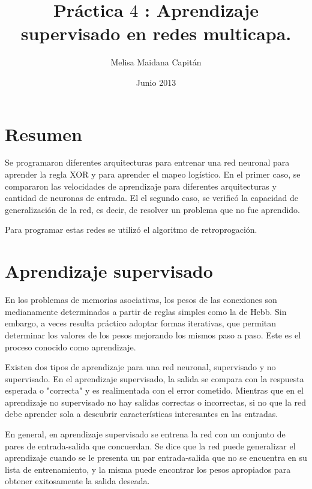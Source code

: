 \documentclass[aps,prb,onecolumn,10pt,floatfix,superscriptaddress]{article} %
\begin{document}
\title{Pr\'actica $4$ : Aprendizaje supervisado en redes multicapa.}

\author{Melisa Maidana Capit\'an}

\date{Junio 2013} %

\maketitle 
% 

\setlength{\parindent}{30pt}
\setlength{\parskip}{2.5ex plus 0ex minus 0ex}

\section*{Resumen}

Se programaron diferentes arquitecturas para entrenar una red neuronal para aprender la regla XOR y para aprender el mapeo log\'istico. En el primer caso, se compararon las velocidades de aprendizaje para diferentes arquitecturas y cantidad de neuronas de entrada. El el segundo caso, se verific\'o la capacidad de generalizaci\'on de la red, es decir, de resolver un problema que no fue aprendido.

Para programar estas redes se utiliz\'o el algoritmo de retroprogaci\'on.

\section{Aprendizaje supervisado}

En los problemas de memorias asociativas, los pesos de las conexiones son medianamente determinados a partir de reglas simples como la de Hebb. Sin embargo, a veces resulta pr\'actico adoptar formas iterativas, que permitan determinar los valores de los pesos mejorando los mismos paso a paso. Este es el proceso conocido como aprendizaje.

Existen dos tipos de aprendizaje para una red neuronal, supervisado y no supervisado. En el aprendizaje supervisado, la salida se compara con la respuesta esperada o "correcta" y es realimentada con el error cometido. Mientras que en el aprendizaje no supervisado no hay salidas correctas o incorrectas, si no que la red debe aprender sola a descubrir caracter\'isticas interesantes en las entradas.

En general, en aprendizaje supervisado se entrena la red con un conjunto de pares de entrada-salida que concuerdan. Se dice que la red puede generalizar el aprendizaje cuando se le presenta un par entrada-salida que no se encuentra en su lista de entrenamiento, y la misma puede encontrar los pesos apropiados para obtener exitosamente la salida deseada.
\end{document}
